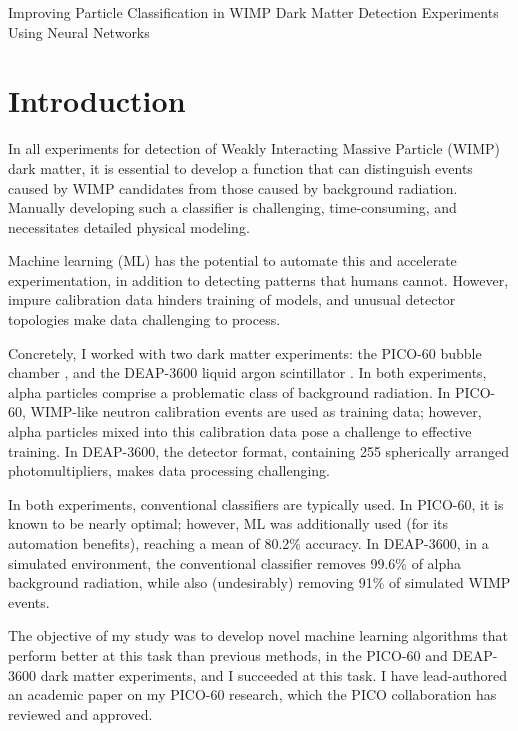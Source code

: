 \documentclass[12pt]{article}
\begin{document}
\begin{LARGE}
    \begin{center}
        Improving Particle Classification in WIMP Dark Matter Detection Experiments Using Neural Networks
    \end{center}
\end{LARGE}

\doublespacing

\section{Introduction}

In all experiments for detection of Weakly Interacting Massive Particle (WIMP) dark matter, it is essential to develop a function that can distinguish events caused by WIMP candidates from those caused by background radiation. Manually developing such a classifier is challenging, time-consuming, and necessitates detailed physical modeling.

Machine learning (ML) has the potential to automate this and accelerate experimentation, in addition to detecting patterns that humans cannot. However, impure calibration data hinders training of models, and unusual detector topologies make data challenging to process.

Concretely, I worked with two dark matter experiments: the PICO-60 bubble chamber \cite{pico}, and the DEAP-3600 liquid argon scintillator \cite{deap}. In both experiments, alpha particles comprise a problematic class of background radiation. In PICO-60, WIMP-like neutron calibration events are used as training data; however, alpha particles mixed into this calibration data pose a challenge to effective training. In DEAP-3600, the detector format, containing 255 spherically arranged photomultipliers, makes data processing challenging.

In both experiments, conventional classifiers are typically used. In PICO-60, it is known to be nearly optimal; however, ML was additionally used (for its automation benefits), reaching a mean of 80.2\% accuracy. In DEAP-3600, in a simulated environment, the conventional classifier removes 99.6\% of alpha background radiation, while also (undesirably) removing 91\% of simulated WIMP events.

The objective of my study was to develop novel machine learning algorithms that perform better at this task than previous methods, in the PICO-60 and DEAP-3600 dark matter experiments, and I succeeded at this task. I have lead-authored an academic paper \cite{me} on my PICO-60 research, which the PICO collaboration has reviewed and approved.

\singlespacing
\printbibliography
\end{document}
